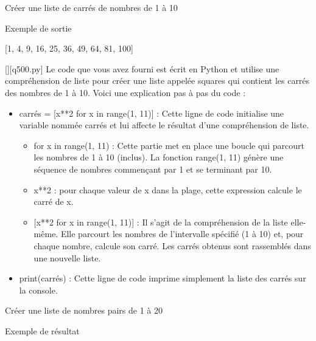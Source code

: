 
        \question
        Créer une liste de carrés de nombres de 1 à 10

Exemple de sortie

[1, 4, 9, 16, 25, 36, 49, 64, 81, 100]
        \par
        \begin{solution}
            \renewcommand{\nomfichier}{q500.py}
            \pythonfile{\chemincode \nomfichier}[][\nomfichier]
            Le code que vous avez fourni est écrit en Python et utilise une compréhension de liste pour créer une liste appelée squares qui contient les carrés des nombres de 1 à 10. Voici une explication pas à pas du code :\par

\begin{itemize}
\item     carrés = [x**2 for x in range(1, 11)] : Cette ligne de code initialise une variable nommée carrés et lui affecte le résultat d'une compréhension de liste.

\begin{itemize}
\item         for x in range(1, 11) : Cette partie met en place une boucle qui parcourt les nombres de 1 à 10 (inclus). La fonction range(1, 11) génère une séquence de nombres commençant par 1 et se terminant par 10.
\item         x**2 : pour chaque valeur de x dans la plage, cette expression calcule le carré de x.
\item{}    [x**2 for x in range(1, 11)]  : Il s'agit de la compréhension de la liste elle-même. Elle parcourt les nombres de l'intervalle spécifié (1 à 10) et, pour chaque nombre, calcule son carré. Les carrés obtenus sont rassemblés dans une nouvelle liste.
\end{itemize}
    \item print(carrés) : Cette ligne de code imprime simplement la liste des carrés sur la console.
\end{itemize}
        \end{solution}
        

        \question
        Créer une liste de nombres pairs de 1 à 20

Exemple de résultat

